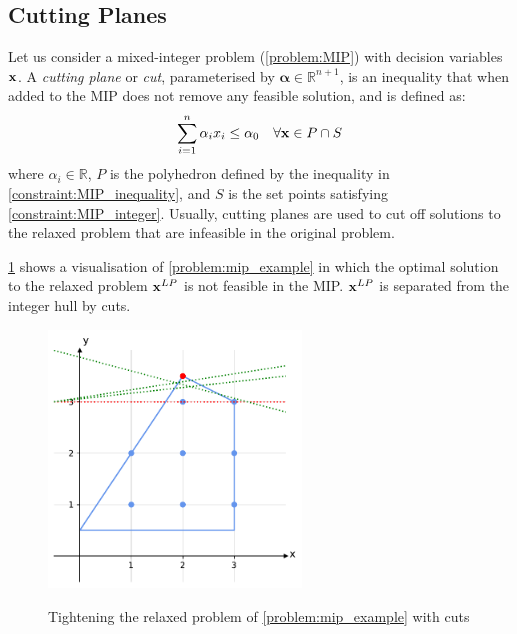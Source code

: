 \subsection{Cutting Planes} \label{section:cuts}
Let us consider a mixed-integer problem (\cref{problem:MIP}) with decision variables $\bold x$. A \textit{cutting plane} or \textit{cut}, parameterised by $\boldsymbol \alpha \in \mathbb{R}^{n+1}$, is an inequality that when added to the MIP does not remove any feasible solution, and is defined as: 
\begin{equation} \label{Eq:cuts}
    \sum_{i=1}^n \alpha_i x_i \leq \alpha_0 \quad  \forall \bold x \in P \cap S
\end{equation} 
\quad where $\alpha_i \in \mathbb{R}$, $P$ is the polyhedron defined by the inequality in \cref{constraint:MIP_inequality}, and $S$ is the set points satisfying \cref{constraint:MIP_integer}. Usually, cutting planes are used to cut off solutions to the relaxed problem that are infeasible in the original problem. 

\cref{fig:cuts} shows a visualisation of \cref{problem:mip_example} in which the optimal solution to the relaxed problem $\bold x^{LP}$ is not feasible in the MIP. $\bold x^{LP}$ is separated from the integer hull by cuts.

\begin{figure}[!h]
    \caption{Tightening the relaxed problem of \cref{problem:mip_example} with cuts}
    \centering
    \includegraphics[width=0.6\textwidth]{Images/mip_cut.pdf}
    \label{fig:cuts}
\end{figure}

